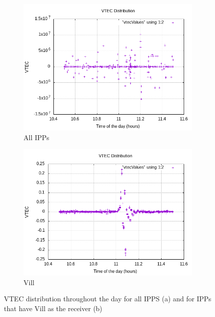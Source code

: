 \begin{figure}[!htb]
	\begin{subfigure}[b]{0.5\textwidth}
		\includegraphics[width=\linewidth]{images/ch4/vtecDistributionGeneral.png}
		\caption{All IPPs}
	\end{subfigure}
	\hfill
	\begin{subfigure}[b]{0.5\textwidth}
		\includegraphics[width=\linewidth]{images/ch4/vtecDistributionVill.png}
		\caption{Vill}
	\end{subfigure}
	\caption{VTEC distribution throughout the day for all IPPS (a) and for IPPs that have Vill as the receiver (b)}
	\label{fig:vtecDistribution}
\end{figure}

